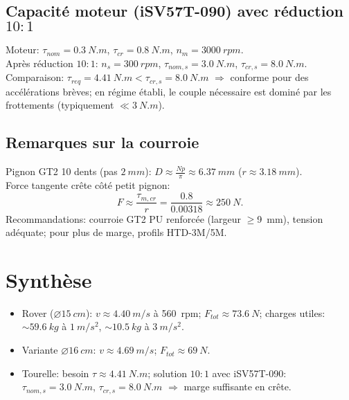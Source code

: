 \documentclass[11pt,a4paper]{article}
\begin{document}
\subsection{Capacité moteur (iSV57T-090) avec réduction \(10{:}1\)}
Moteur: \(\tau_{nom}=\SI{0.3}{N.m}\), \(\tau_{cr}=\SI{0.8}{N.m}\), \(n_m=\SI{3000}{rpm}\).\\
Après réduction \(10{:}1\): \(n_s=\SI{300}{rpm}\), \(\tau_{nom,s}=\SI{3.0}{N.m}\), \(\tau_{cr,s}=\SI{8.0}{N.m}\).\\[4pt]
Comparaison: \(\tau_{req}=\SI{4.41}{N.m} < \tau_{cr,s}=\SI{8.0}{N.m}\) \(\Rightarrow\) conforme pour des accélérations brèves; en régime établi, le couple nécessaire est dominé par les frottements (typiquement \(\ll \SI{3}{N.m}\)).

\subsection{Remarques sur la courroie}
Pignon GT2 10 dents (pas \(\SI{2}{mm}\)): \(D \approx \frac{Np}{\pi}\approx \SI{6.37}{mm}\) (\(r\approx\SI{3.18}{mm}\)).\\
Force tangente crête côté petit pignon:
\begin{equation}
F\approx \frac{\tau_{m,cr}}{r}=\frac{0.8}{0.00318}\approx \SI{250}{N}.
\end{equation}
Recommandations: courroie GT2 PU renforcée (largeur \(\ge\)\SI{9}{mm}), tension adéquate; pour plus de marge, profils HTD-3M/5M.

\section{Synthèse}
\begin{itemize}
  \item Rover (\(\varnothing \SI{15}{cm}\)): \(v\approx \SI{4.40}{m/s}\) à \SI{560}{rpm}; \(F_{tot}\approx \SI{73.6}{N}\); charges utiles: \(\sim\SI{59.6}{kg}\) à \(\SI{1}{m/s^2}\), \(\sim\SI{10.5}{kg}\) à \(\SI{3}{m/s^2}\).
  \item Variante \(\varnothing \SI{16}{cm}\): \(v\approx \SI{4.69}{m/s}\); \(F_{tot}\approx \SI{69}{N}\).
  \item Tourelle: besoin \(\tau\approx \SI{4.41}{N.m}\); solution \(10{:}1\) avec iSV57T-090: \(\tau_{nom,s}=\SI{3.0}{N.m}\), \(\tau_{cr,s}=\SI{8.0}{N.m}\) \(\Rightarrow\) marge suffisante en crête.
\end{itemize}
\end{document}
